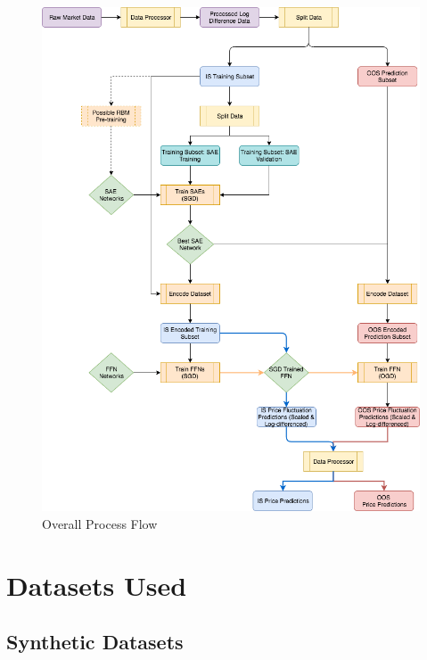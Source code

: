 \documentclass[a4paper,11pt,oneside]{article}
\theoremstyle{plain}
\theoremstyle{definition}
\begin{document}
\begin{figure}[H]
	\centering \includegraphics[scale=0.6]{images/process_implementation/process_flow.png}
	\caption[Overall Process Flow Diagram]{Overall Process Flow}
	\label{figure-proc_diagram}
\end{figure}






















\newpage
\section{Datasets Used}\label{Datasets}

\subsection{Synthetic Datasets}
\end{document}
